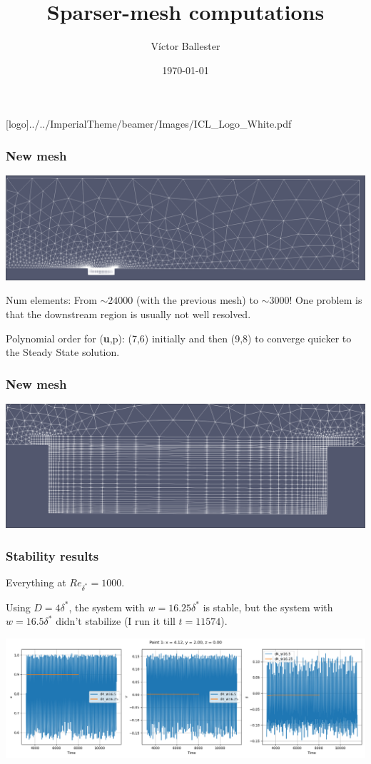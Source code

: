 \documentclass[
	aspectratio=169, %
	t, %
	onlytextwidth, %
	10pt, %
]{beamer}
\title{Sparser-mesh computations} %
\subtitle{} %
\author{Víctor Ballester} %
\date{\today} %
\def\imagefolder{../../ImperialTheme/beamer/Images}
\begin{document}
\begingroup
{} %
[logo]{\imagefolder/ICL_Logo_White.pdf} %
\frame[plain, s]{\titlepage} %
\endgroup

\begin{frame}
	\frametitle{New mesh}
	{
		\centering
	  \includegraphics[width=\linewidth]{Images/mesh.png}
  }


  Num elements:  From $\sim24000$ (with the previous mesh) to $\sim3000$!
	One problem is that the downstream region is usually not well resolved.

	Polynomial order for (\textbf{u},p): (7,6) initially and then (9,8) to converge quicker to the Steady State solution.
\end{frame}
\begin{frame}
	\frametitle{New mesh}
	 \centering
	 \includegraphics[width=\linewidth]{Images/meshGap.png}
	
\end{frame}
\begin{frame}
	\frametitle{Stability results}
	Everything at $Re_{\delta^*}=1000$.

	Using $D=4\delta^*$, the system with $w=16.25\delta^*$ is stable, but the system with $w=16.5\delta^*$ didn't stabilize (I run it till $t=11574$).

	{
		\centering
		\includegraphics[width=\linewidth]{Images/evolutionU_16.25_16.5.png}
	}

\end{frame}
\end{document}
